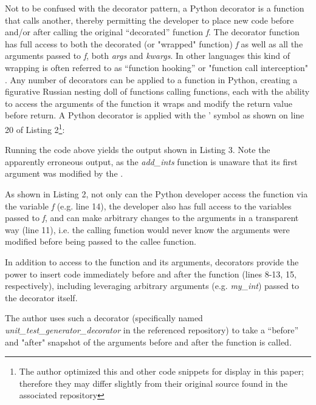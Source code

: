 Not to be confused with the decorator pattern, a Python decorator is a 
function that calls another, thereby permitting the developer to place new code 
before and/or after calling the original “decorated” function \textit{f}.  
The decorator function has full access to both the decorated 
(or "wrapped" function) \textit{f} as well as all the 
arguments passed to \textit{f}, both \textit{args} and \textit{kwargs}.  In other 
languages this kind of wrapping is often referred to as 
“function hooking” or "function call interception" 
 \cite{kang2018function}. Any number of decorators can be applied to a function 
in Python, creating a figurative Russian nesting doll of
functions calling functions, each with the ability to access the 
arguments of the function it wraps and modify the 
return value before return. A Python decorator is applied with the \lq@\rq 
symbol as shown on line 20 of Listing 2\footnote{The author optimized this and other code snippets for display in 
this paper; therefore they may differ slightly from their original 
source found in the associated repository}:



Running the code above yields the output shown in Listing 3. Note the apparently erroneous
output, as the \textit{add\_ints} function is unaware that its first argument was
modified by the .



As shown in Listing 2, not only can the Python developer access the function
via the variable \textit{f} (e.g. line 14), the developer also has full
access to the variables passed to \textit{f}, and can make 
arbitrary changes to the arguments in a transparent way (line 11), 
i.e. the calling function would never know the arguments 
were modified before being passed to the callee function.

In addition to access to the function and its arguments,
decorators provide the power to insert code immediately before and after 
the function (lines 8-13, 15, respectively), including leveraging arbitrary
arguments (e.g. \textit{my\_int}) passed to the decorator itself.

The author uses such a decorator (specifically named 
\break
\textit{unit\_test\_generator\_decorator} in the referenced repository) to take
 a “before” and "after" snapshot of the arguments
before and after the function is called.


